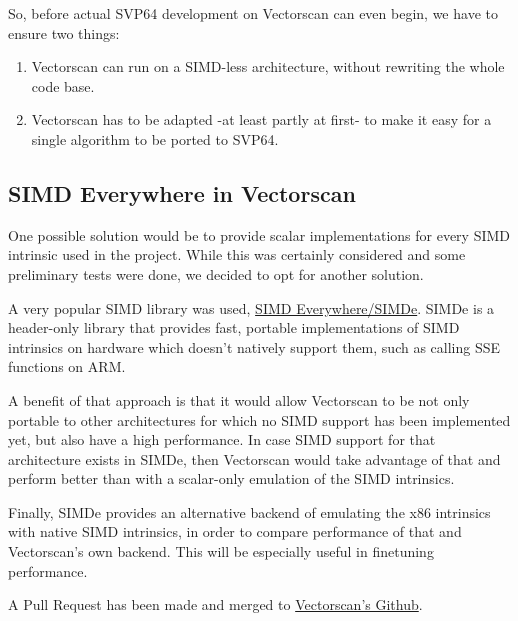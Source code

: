 So, before actual \acrshort{SVP64} development on Vectorscan can even begin, we have to ensure two things:

\begin{enumerate}
  \item Vectorscan can run on a \acrshort{SIMD}-less architecture, without rewriting the whole code base.
  \item Vectorscan has to be adapted -at least partly at first- to make it easy for a single algorithm to be ported to \acrshort{SVP64}.
\end{enumerate}

\subsection{SIMD Everywhere in Vectorscan}

One possible solution would be to provide scalar implementations for every \acrshort{SIMD} intrinsic used in the project.
While this was certainly considered and some preliminary tests were done, we decided to opt for another solution.
\par

A very popular \acrshort{SIMD} library was used, \href{https://github.com/simd-everywhere/simde}{SIMD Everywhere/SIMDe}.
SIMDe is a header-only library that provides fast, portable implementations of \acrshort{SIMD} intrinsics on hardware which doesn't natively support them, such as calling \acrshort{SSE} functions on \acrshort{ARM}.
\par

A benefit of that approach is that it would allow Vectorscan to be not only portable to other architectures
for which no \acrshort{SIMD} support has been implemented yet, but also have a high performance.
In case \acrshort{SIMD} support for that architecture exists in SIMDe,
then Vectorscan would take advantage of that and perform better than with a scalar-only emulation of the \acrshort{SIMD} intrinsics.
\par

Finally, SIMDe provides an alternative backend of emulating the x86 intrinsics with native \acrshort{SIMD} intrinsics,
in order to compare performance of that and Vectorscan's own backend.
This will be especially useful in finetuning performance.
\par

A Pull Request has been made and merged to \href{https://github.com/VectorCamp/vectorscan/pull/203}{Vectorscan's Github}.
\par

